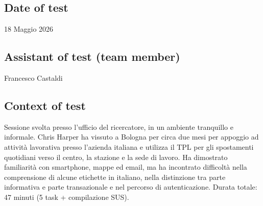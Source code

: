 \documentclass[11pt,a4paper]{article}
\begin{document}
\subsection*{Date of test}
\begin{tcolorbox}[colback=backgroundColor,colframe=borderColor,arc=2mm]
18 Maggio 2026
\end{tcolorbox}

\subsection*{Assistant of test (team member)}
\begin{tcolorbox}[colback=backgroundColor,colframe=borderColor,arc=2mm]
Francesco Castaldi
\end{tcolorbox}

\subsection*{Context of test}
\begin{tcolorbox}[colback=backgroundColor,colframe=borderColor,arc=2mm]
Sessione svolta presso l'ufficio del ricercatore, in un ambiente tranquillo e informale. Chris Harper ha vissuto a Bologna per circa due mesi per appoggio ad attività lavorativa presso l'azienda italiana e utilizza il TPL per gli spostamenti quotidiani verso il centro, la stazione e la sede di lavoro. Ha dimostrato familiarità con smartphone, mappe ed email, ma ha incontrato difficoltà nella comprensione di alcune etichette in italiano, nella distinzione tra parte informativa e parte transazionale e nel percorso di autenticazione. Durata totale: 47 minuti (5 task + compilazione SUS).
\end{tcolorbox}
\end{document}
